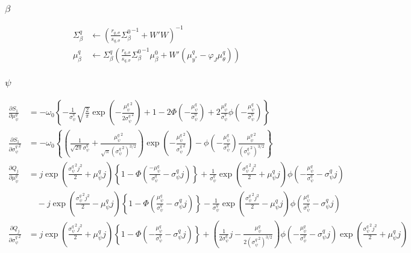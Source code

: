 \documentclass[11pt]{article}
\begin{document}
\subsubsection{$\beta$}
\begin{align*}
  \Sigma_{\beta}^{q} &\leftarrow \left(\frac{r_{q,\sigma}}{s_{q,\sigma}}{\Sigma_{\beta}^{0}}^{-1}+W'W \right)^{-1}\\
  \mu_{\beta}^{q} &\leftarrow \Sigma_{\beta}^{q}\left(\frac{r_{q,\sigma}}{s_{q,\sigma}}{\Sigma_{\beta}^{0}}^{-1}\mu_{\beta}^{0}+W'\left(\mu_{y^*}^{q}-\varphi_{J}\mu_{\theta}^{q}\right)\right)
\end{align*}
\subsubsection{$\psi$}
\begin{align*}
  \frac{\partial S_{1}}{\partial \mu_{\psi}^{q}} &= -\omega_{0}\left\{-\frac{1}{\sigma_{\psi}^{q}}\sqrt{\frac{2}{\pi}}\exp\left(-\frac{{\mu_{\psi}^{q}}^{2}}{2{\sigma_{\psi}^{q}}^{2}} \right) + 1 -2\Phi\left(-\frac{\mu_{\psi}^{q}}{\sigma_{\psi}^{q}}\right)+2\frac{\mu_{\psi}^{q}}{\sigma_{\psi}^{q}}\phi\left(-\frac{\mu_{\psi}^{q}}{\sigma_{\psi}^{q}}\right) \right\}\\
  \frac{\partial S_{1}}{\partial {\sigma_{\psi}^{q}}^{2}} &= -\omega_{0}\left\{\left(\frac{1}{\sqrt{2\pi}\sigma_{\psi}^{q}}+\frac{{\mu_{\psi}^{q}}^{2}}{\sqrt{\pi}\left({\sigma_{\psi}^{q}}^{2} \right)^{3/2}} \right)\exp\left(-\frac{{\mu_{\psi}^{q}}^{2}}{{\sigma_{\psi}^{q}}^{2}} \right) -\phi\left(-\frac{\mu_{\psi}^{q}}{\sigma_{\psi}^{q}}\right)\frac{{\mu_{\psi}^{q}}^{2}}{\left({\sigma_{\psi}^{q}}^{2} \right)^{3/2}} \right\}\\
  \frac{\partial Q_{j}}{\partial \mu_{\psi}^{q}} &= j\exp\left(\frac{{\sigma_{\psi}^{q}}^{2}j^{2}}{2} +\mu_{\psi}^{q}j \right)\left\{1-\Phi\left(\frac{-\mu_{\psi}^{q}}{\sigma_{\psi}^{q}}-\sigma_{\psi}^{q}j\right) \right\}+\frac{1}{\sigma_{\psi}^{q}}\exp\left(\frac{{\sigma_{\psi}^{q}}^{2}j^{2}}{2}+\mu_{\psi}^{q}j \right)\phi\left(-\frac{\mu_{\psi}^{q}}{\sigma_{\psi}^{q}}-\sigma_{\psi}^{q}j\right)\\
  &\quad -j\exp\left(\frac{{\sigma_{\psi}^{q}}^{2}j^{2}}{2} -\mu_{\psi}^{q}j \right)\left\{1-\Phi\left(\frac{\mu_{\psi}^{q}}{\sigma_{\psi}^{q}}-\sigma_{\psi}^{q}j\right) \right\}-\frac{1}{\sigma_{\psi}^{q}}\exp\left(\frac{{\sigma_{\psi}^{q}}^{2}j^{2}}{2}-\mu_{\psi}^{q}j \right)\phi\left(\frac{\mu_{\psi}^{q}}{\sigma_{\psi}^{q}}-\sigma_{\psi}^{q}j\right)\\
  \frac{\partial Q_{j}}{\partial {\sigma_{\psi}^{q}}^{2}} &= j\exp\left(\frac{{\sigma_{\psi}^{q}}^{2}j^{2}}{2}+\mu_{\psi}^{q}j \right)\left\{1-\Phi\left(-\frac{\mu_{\psi}^{q}}{\sigma_{\psi}^{q}}-\sigma_{\psi}^{q}j\right) \right\}+\left(\frac{1}{2\sigma_{\psi}^{q}}j -\frac{\mu_{\psi}^{q}}{2\left({\sigma_{\psi}^{q}}^{2} \right)^{3/2}}\right)\phi\left(-\frac{\mu_{\psi}^{q}}{\sigma_{\psi}^{q}}-\sigma_{\psi}^{q}j\right)\exp\left(\frac{{\sigma_{\psi}^{q}}^{2}j^{2}}{2} +\mu_{\psi}^{q}j \right)\\

\end{align*}
\end{document}

